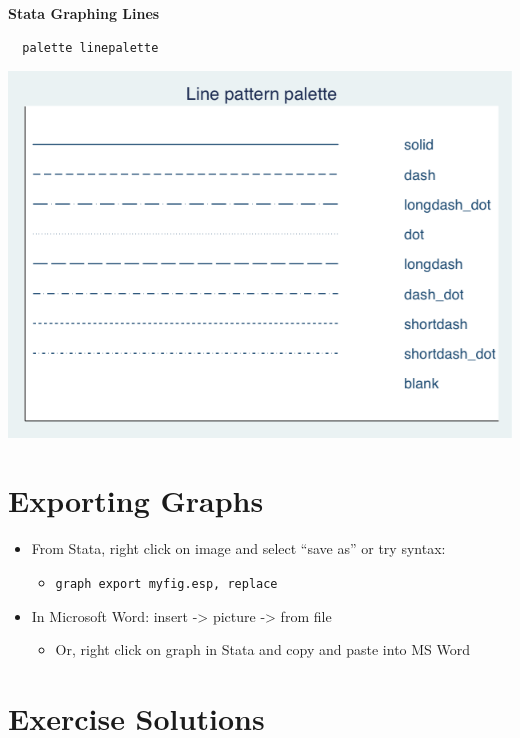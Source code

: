 \documentclass[]{book}
\providecommand{\tightlist}{%
  \setlength{\itemsep}{0pt}\setlength{\parskip}{0pt}}
\begin{document}
\textbf{Stata Graphing Lines}

\begin{verbatim}
  palette linepalette
\end{verbatim}

\includegraphics{Stata/StataModGraph/images/linepalette.png}

\hypertarget{exporting-graphs}{%
\section{Exporting Graphs}\label{exporting-graphs}}

\begin{itemize}
\tightlist
\item
  From Stata, right click on image and select ``save as'' or try syntax:

  \begin{itemize}
  \tightlist
  \item
    \texttt{graph\ export\ myfig.esp,\ replace}
  \end{itemize}
\item
  In Microsoft Word: insert -\textgreater{} picture -\textgreater{} from file

  \begin{itemize}
  \tightlist
  \item
    Or, right click on graph in Stata and copy and paste into MS Word
  \end{itemize}
\end{itemize}

\hypertarget{exercise-solutions-2}{%
\section{Exercise Solutions}\label{exercise-solutions-2}}
\end{document}
